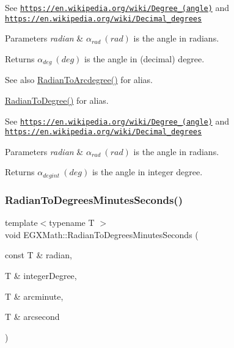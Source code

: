 See \href{https://en.wikipedia.org/wiki/Degree_(angle)}{\tt https\+://en.\+wikipedia.\+org/wiki/\+Degree\+\_\+(angle)} and \href{https://en.wikipedia.org/wiki/Decimal_degrees}{\tt https\+://en.\+wikipedia.\+org/wiki/\+Decimal\+\_\+degrees} 
\begin{DoxyParams}{Parameters}
{\em radian} & $\alpha_{rad}\ (rad)$ is the angle in radians. \\
\hline
\end{DoxyParams}
\begin{DoxyReturn}{Returns}
$\alpha_{deg}\ (deg)$ is the angle in (decimal) degree. 
\end{DoxyReturn}
\begin{DoxySeeAlso}{See also}
\mbox{\hyperlink{group___e_g_x_math-_angle_conversions-_radian_ga3dfdc97357cc07f8379976bbc08f9852}{Radian\+To\+Arcdegree()}} for alias. 

\mbox{\hyperlink{group___e_g_x_math-_angle_conversions-_radian_ga25bbce6cdc1c3621f2a158d320e3bc45}{Radian\+To\+Degree()}} for alias.
\end{DoxySeeAlso}
See \href{https://en.wikipedia.org/wiki/Degree_(angle)}{\tt https\+://en.\+wikipedia.\+org/wiki/\+Degree\+\_\+(angle)} and \href{https://en.wikipedia.org/wiki/Decimal_degrees}{\tt https\+://en.\+wikipedia.\+org/wiki/\+Decimal\+\_\+degrees} 
\begin{DoxyParams}{Parameters}
{\em radian} & $\alpha_{rad}\ (rad)$ is the angle in radians. \\
\hline
\end{DoxyParams}
\begin{DoxyReturn}{Returns}
$\alpha_{deg int}\ (deg)$ is the angle in integer degree. 
\end{DoxyReturn}
\mbox{\label{group___e_g_x_math-_angle_conversions-_radian_gadae98c255924fdc8b232b6539eae81a9}} 
\subsubsection{\texorpdfstring{Radian\+To\+Degrees\+Minutes\+Seconds()}{RadianToDegreesMinutesSeconds()}}
{\footnotesize\ttfamily template$<$typename T $>$ \\
void E\+G\+X\+Math\+::\+Radian\+To\+Degrees\+Minutes\+Seconds (\begin{DoxyParamCaption}\item[{const T \&}]{radian,  }\item[{T \&}]{integer\+Degree,  }\item[{T \&}]{arcminute,  }\item[{T \&}]{arcsecond }\end{DoxyParamCaption})}



